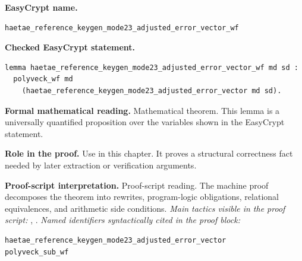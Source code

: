 \begin{formaltheorem}
\noindent\textbf{EasyCrypt name.}
\begin{lstlisting}[language=EasyCrypt,basicstyle=\ttfamily\scriptsize]
haetae_reference_keygen_mode23_adjusted_error_vector_wf
\end{lstlisting}
\noindent\textbf{Checked EasyCrypt statement.}
\begin{lstlisting}[language=EasyCrypt,basicstyle=\ttfamily\scriptsize]
lemma haetae_reference_keygen_mode23_adjusted_error_vector_wf md sd :
  polyveck_wf md
    (haetae_reference_keygen_mode23_adjusted_error_vector md sd).
\end{lstlisting}
\noindent\textbf{Formal mathematical reading.}
Mathematical theorem. This lemma is a universally quantified proposition over the variables shown in the EasyCrypt statement.

\noindent\textbf{Role in the proof.}
Use in this chapter. It proves a structural correctness fact needed by later extraction or verification arguments.

\noindent\textbf{Proof-script interpretation.}
Proof-script reading. The machine proof decomposes the theorem into rewrites, program-logic obligations, relational equivalences, and arithmetic side conditions.
\emph{Main tactics visible in the proof script:} , .
\emph{Named identifiers syntactically cited in the proof block:}
\begin{lstlisting}[language=EasyCrypt,basicstyle=\ttfamily\scriptsize]
haetae_reference_keygen_mode23_adjusted_error_vector
polyveck_sub_wf
\end{lstlisting}

\end{formaltheorem}

